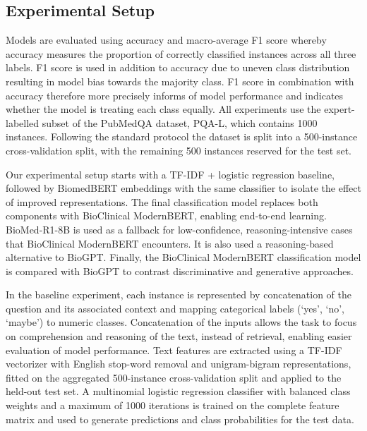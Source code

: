 \documentclass[11pt]{article}
\begin{document}
\subsection{Experimental Setup}
Models are evaluated using accuracy and macro-average F1 score whereby accuracy measures the proportion of correctly classified instances across all three labels. F1 score is used in addition to accuracy due to uneven class distribution resulting in model bias towards the majority class. F1 score in combination with accuracy therefore more precisely informs of model performance and indicates whether the model is treating each class equally. 
All experiments use the expert-labelled subset of the PubMedQA dataset, PQA-L, which contains 1000 instances. Following the standard protocol the dataset is split into a 500-instance cross-validation split, with the remaining 500 instances reserved for the test set. \par
Our experimental setup starts with a TF-IDF + logistic regression baseline, followed by BiomedBERT embeddings with the same  classifier to isolate the effect of improved representations. The final classification model replaces both components with BioClinical ModernBERT, enabling end-to-end learning. BioMed-R1-8B is used as a fallback for low-confidence, reasoning-intensive cases that BioClinical ModernBERT encounters. It is also used a reasoning-based alternative to BioGPT. Finally, the BioClinical ModernBERT classification model is compared with BioGPT to contrast discriminative and generative approaches. \par
In the baseline experiment, each instance is represented by concatenation of the question and its associated context and mapping categorical labels (‘yes’, ‘no’, ‘maybe’) to numeric classes. Concatenation of the inputs allows the task to focus on comprehension and reasoning of the text, instead of retrieval, enabling easier evaluation of model performance. Text features are extracted using a TF-IDF vectorizer with English stop-word removal and unigram-bigram representations, fitted on the aggregated 500-instance cross-validation split and applied to the held-out test set. A multinomial logistic regression classifier with balanced class weights and a maximum of 1000 iterations is trained on the complete feature matrix and used to generate predictions and class probabilities for the test data. 
\end{document}
